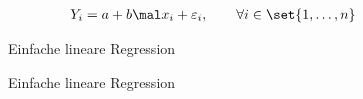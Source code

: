 \begin{beispiel}
\label{beisp3.5einfacheLineareRegression}
	\begin{align*}
		Y_i&=a+b\mal x_i+\varepsilon_i,\qquad\forall i\in\set{1,\ldots,n}
	\end{align*}

	\begin{figure}[H]
		\begin{center}
			
			\caption{Einfache lineare Regression}
		\end{center}
	\end{figure}
	
	\begin{figure}[H]
		\begin{center}
			
			\caption{Einfache lineare Regression}
		\end{center}
	\end{figure}


\end{beispiel}
